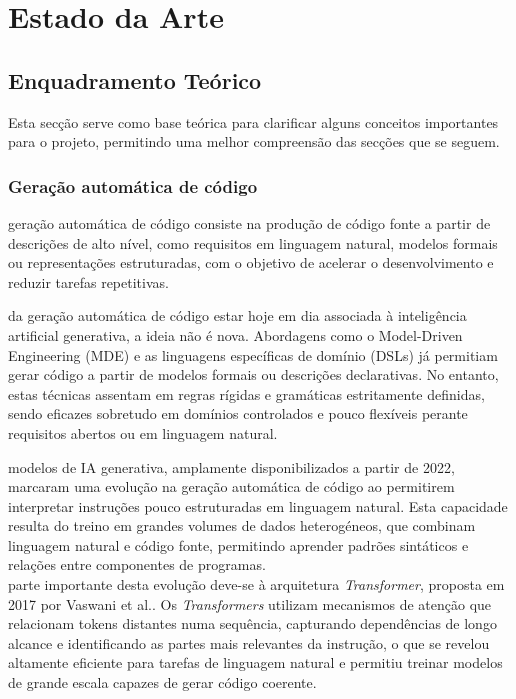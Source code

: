\chapter{Estado da Arte}
\label{chap:estado-da-arte}

\section{Enquadramento Teórico} \label{sec:background}

Esta secção serve como base teórica para clarificar alguns conceitos importantes para o projeto, permitindo uma melhor compreensão das secções que se seguem.\\\par

\subsection{Geração automática de código}
 geração automática de código consiste na produção de código fonte a partir de descrições de alto nível, como requisitos em linguagem natural, modelos formais ou representações estruturadas, com o objetivo de acelerar o desenvolvimento e reduzir tarefas repetitivas.\par

\medskip{} da geração automática de código estar hoje em dia associada à inteligência artificial generativa, a ideia não é nova. Abordagens como o Model-Driven Engineering (MDE)\cite{MDE-Schmidt,MDEInPratice} e as linguagens específicas de domínio (DSLs)\cite{DSLs} já permitiam gerar código a partir de modelos formais ou descrições declarativas. No entanto, estas técnicas assentam em regras rígidas e gramáticas estritamente definidas, sendo eficazes sobretudo em domínios controlados e pouco flexíveis perante requisitos abertos ou em linguagem natural.\\\par

 modelos de IA generativa, amplamente disponibilizados a partir de 2022, marcaram uma evolução na geração automática de código ao permitirem interpretar instruções pouco estruturadas em linguagem natural\cite{Codex}. Esta capacidade resulta do treino em grandes volumes de dados heterogéneos, que combinam linguagem natural e código fonte, permitindo aprender padrões sintáticos e relações entre componentes de programas.\\

 parte importante desta evolução deve-se à arquitetura \textit{Transformer}, proposta em 2017 por Vaswani et al.\cite{Transformer}. Os \textit{Transformers} utilizam mecanismos de atenção que relacionam tokens distantes numa sequência, capturando dependências de longo alcance e identificando as partes mais relevantes da instrução, o que se revelou altamente eficiente para tarefas de linguagem natural e permitiu treinar modelos de grande escala capazes de gerar código coerente\cite{Codex}.\\

